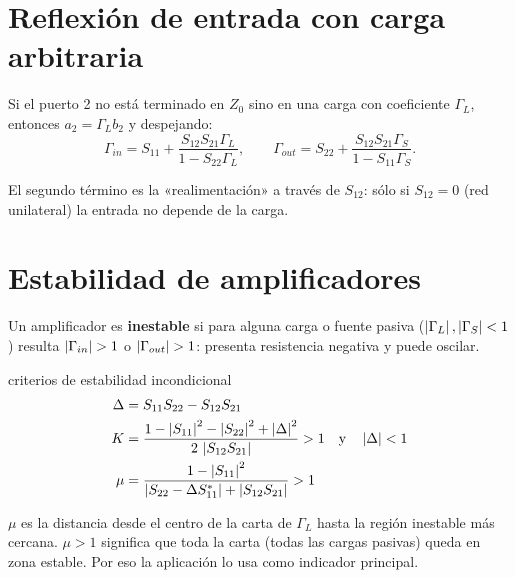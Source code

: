 \section{Reflexión de entrada con carga arbitraria}
Si el puerto 2 no está terminado en $Z_0$ sino en una carga con coeficiente $\Gamma_L$, entonces $a_2 = \Gamma_L b_2$ y despejando:
\begin{equation}
  \Gamma_{in} = S_{11} + \frac{S_{12}S_{21}\Gamma_L}{1 - S_{22}\Gamma_L}, \qquad
  \Gamma_{out} = S_{22} + \frac{S_{12}S_{21}\Gamma_S}{1 - S_{11}\Gamma_S}.
\end{equation}
\begin{donde}
\end{donde}
El segundo término es la «realimentación» a través de $S_{12}$: sólo si $S_{12} = 0$ (red unilateral) la entrada no depende de la carga.

\section{Estabilidad de amplificadores}

Un amplificador es \textbf{inestable} si para alguna carga o fuente pasiva ($\left|\Gamma_L\right|, \left|\Gamma_S\right| < 1$) resulta
$\left|\Gamma_{in}\right| > 1$ o $\left|\Gamma_{out}\right| > 1$: presenta resistencia negativa y puede oscilar.

\begin{definicion}{criterios de estabilidad incondicional}
\begin{align}
  \Delta &= S_{11}S_{22} - S_{12}S_{21}\\
  K &= \frac{1 - \left|S_{11}\right|^2 - \left|S_{22}\right|^2 + \left|\Delta\right|^2}{2\,\left|S_{12}S_{21}\right|} > 1 \quad\text{y}\quad \left|\Delta\right| < 1\\
  \mu &= \frac{1 - \left|S_{11}\right|^2}{\left|S_{22} - \Delta S_{11}^{*}\right| + \left|S_{12}S_{21}\right|} > 1
\end{align}
\begin{donde}
\end{donde}
\end{definicion}
\begin{intuicion}
$\mu$ es la distancia desde el centro de la carta de $\Gamma_L$ hasta la región inestable más cercana. $\mu > 1$ significa que toda la carta
(todas las cargas pasivas) queda en zona estable. Por eso la aplicación lo usa como indicador principal.
\end{intuicion}

